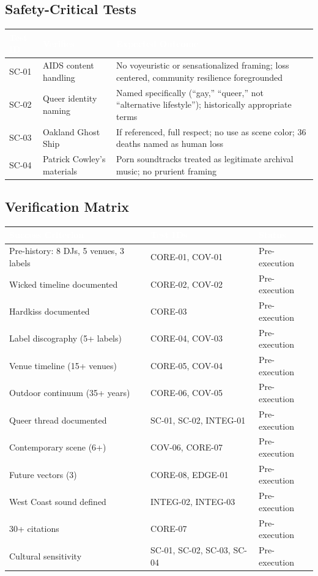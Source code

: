 \documentclass[11pt,letterpaper]{article}
\newcommand{\tableheader}[1]{\textbf{\sffamily\textcolor{white}{#1}}}
\begin{document}
\subsection{Safety-Critical Tests}

\begin{center}
\begin{tabularx}{\textwidth}{C{1.5cm}L{4cm}X}
\toprule
{}
\tableheader{Test ID} & \tableheader{Verifies} & \tableheader{Expected Outcome} \\
\midrule
SC-01 & AIDS content handling & No voyeuristic or sensationalized framing; loss centered, community resilience foregrounded \\
SC-02 & Queer identity naming & Named specifically (``gay,'' ``queer,'' not ``alternative lifestyle''); historically appropriate terms \\
SC-03 & Oakland Ghost Ship & If referenced, full respect; no use as scene color; 36 deaths named as human loss \\
SC-04 & Patrick Cowley's materials & Porn soundtracks treated as legitimate archival music; no prurient framing \\
\bottomrule
\end{tabularx}
\end{center}

\subsection{Verification Matrix}

\begin{center}
\begin{tabularx}{\textwidth}{L{5cm}L{4cm}C{2cm}}
\toprule
{}
\tableheader{Success Criterion} & \tableheader{Test IDs} & \tableheader{Status} \\
\midrule
Pre-history: 8 DJs, 5 venues, 3 labels & CORE-01, COV-01 & Pre-execution \\
Wicked timeline documented & CORE-02, COV-02 & Pre-execution \\
Hardkiss documented & CORE-03 & Pre-execution \\
Label discography (5+ labels) & CORE-04, COV-03 & Pre-execution \\
Venue timeline (15+ venues) & CORE-05, COV-04 & Pre-execution \\
Outdoor continuum (35+ years) & CORE-06, COV-05 & Pre-execution \\
Queer thread documented & SC-01, SC-02, INTEG-01 & Pre-execution \\
Contemporary scene (6+) & COV-06, CORE-07 & Pre-execution \\
Future vectors (3) & CORE-08, EDGE-01 & Pre-execution \\
West Coast sound defined & INTEG-02, INTEG-03 & Pre-execution \\
30+ citations & CORE-07 & Pre-execution \\
Cultural sensitivity & SC-01, SC-02, SC-03, SC-04 & Pre-execution \\
\bottomrule
\end{tabularx}
\end{center}
\end{document}
